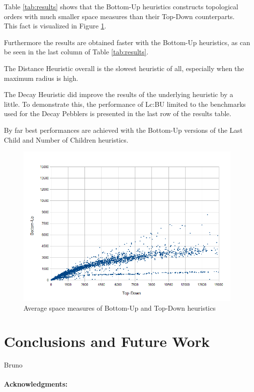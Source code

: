 \documentclass{llncs}
\begin{document}
\noindent
Table \ref{tab:results} shows that the Bottom-Up heuristics constructs topological orders with much smaller space measures than their Top-Down counterparts. This fact is visualized in Figure \ref{fig:BUvsTD}.

Furthermore the results are obtained faster with the Bottom-Up heuristics, as can be seen in the last column of Table \ref{tab:results}.

The Distance Heuristic overall is the slowest heuristic of all, especially when the maximum radius is high.

The Decay Heuristic did improve the results of the underlying heuristic by a little. To demonstrate this, the performance of Lc:BU limited to the benchmarks used for the Decay Pebblers is presented in the last row of the results table.

By far best performances are achieved with the Bottom-Up versions of the Last Child and Number of Children heuristics.

\begin{figure}[tb]
	\centering
	\includegraphics[scale=0.5]{Figures/TD_vs_BU-scatter.png}
	\caption{Average space measures of Bottom-Up and Top-Down heuristics}
	\label{fig:BUvsTD}
\end{figure}

\section{Conclusions and Future Work}

Bruno


\vspace{-10pt}
\paragraph{Acknowledgments:}



\end{document}
